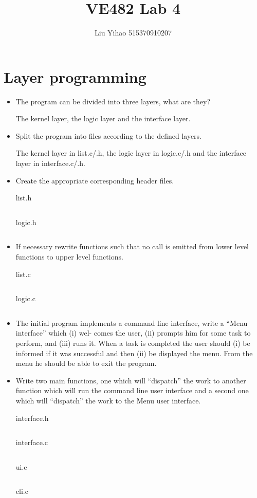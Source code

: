 \documentclass{article}
\title{VE482 Lab 4}
\author{Liu Yihao 515370910207}
\date{}
\begin{document}
\maketitle

\section{Layer programming}
\begin{itemize}
\item The program can be divided into three layers, what are they?

The kernel layer, the logic layer and the interface layer.
\item Split the program into files according to the defined layers.

The kernel layer in list.c/.h, the logic layer in logic.c/.h and the interface layer in interface.c/.h.

\item Create the appropriate corresponding header files.

list.h
\inputminted{c}{list.h}

logic.h
\inputminted{c}{logic.h}

\item If necessary rewrite functions such that no call is emitted from lower level functions to upper level
functions.

list.c
\inputminted{c}{list.c}

logic.c
\inputminted{c}{logic.c}

\item
The initial program implements a command line interface, write a ``Menu interface'' which (i) wel-
comes the user, (ii) prompts him for some task to perform, and (iii) runs it. When a task is
completed the user should (i) be informed if it was successful and then (ii) be displayed the menu.
From the menu he should be able to exit the program.

\item
Write two main functions, one which will ``dispatch'' the work to another function which will run
the command line user interface and a second one which will ``dispatch'' the work to the Menu user
interface.

interface.h
\inputminted{c}{interface.h}

interface.c
\inputminted{c}{interface.c}

ui.c
\inputminted{c}{ui.c}

cli.c
\inputminted{c}{cli.c}
\end{itemize}
\end{document}

